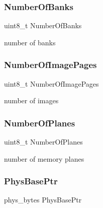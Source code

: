 \subsubsection{\texorpdfstring{Number\+Of\+Banks}{NumberOfBanks}}
{\footnotesize\ttfamily uint8\+\_\+t Number\+Of\+Banks}



number of banks 

\hypertarget{structvbe__mode__info__t_a7033bb4cac6dc49f68ca4df855151e09}{}\label{structvbe__mode__info__t_a7033bb4cac6dc49f68ca4df855151e09} 
\subsubsection{\texorpdfstring{Number\+Of\+Image\+Pages}{NumberOfImagePages}}
{\footnotesize\ttfamily uint8\+\_\+t Number\+Of\+Image\+Pages}



number of images 

\hypertarget{structvbe__mode__info__t_a51268efaac55d78e17263aff9a447998}{}\label{structvbe__mode__info__t_a51268efaac55d78e17263aff9a447998} 
\subsubsection{\texorpdfstring{Number\+Of\+Planes}{NumberOfPlanes}}
{\footnotesize\ttfamily uint8\+\_\+t Number\+Of\+Planes}



number of memory planes 

\hypertarget{structvbe__mode__info__t_a1d11f4921094db253fc2c2ee6fbb2afb}{}\label{structvbe__mode__info__t_a1d11f4921094db253fc2c2ee6fbb2afb} 
\subsubsection{\texorpdfstring{Phys\+Base\+Ptr}{PhysBasePtr}}
{\footnotesize\ttfamily phys\+\_\+bytes Phys\+Base\+Ptr}



